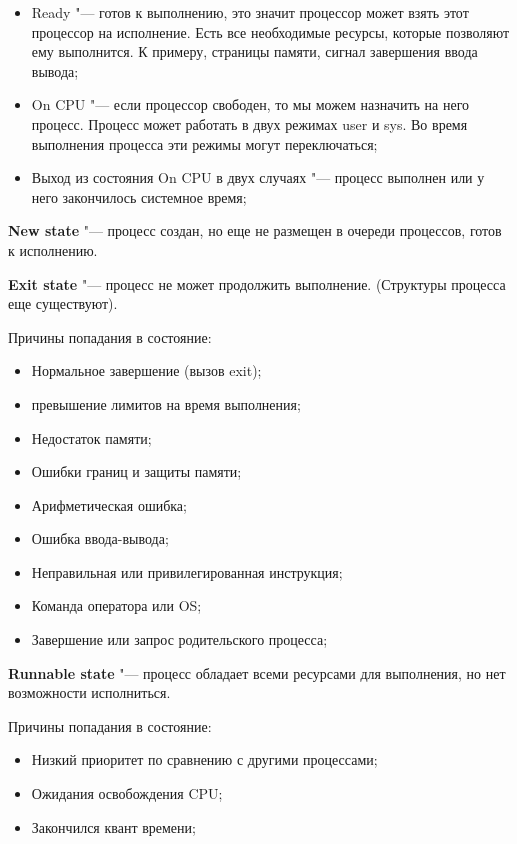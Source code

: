 \documentclass[bachelor, och, book]{SCWorks}
\theoremstyle{remark}
\begin{document}
    \begin{itemize}[label=$\bullet$]
        \item Ready "--- готов к выполнению, это значит процессор может взять этот процессор на исполнение. Есть все необходимые ресурсы, которые позволяют ему выполнится. К примеру, страницы памяти, сигнал завершения ввода вывода;
        \item On CPU "--- если процессор свободен, то мы можем назначить на него процесс. Процесс может работать в двух режимах user и sys. Во время выполнения процесса эти режимы могут переключаться;
        \item Выход из состояния On CPU в двух случаях "--- процесс выполнен или у него закончилось системное время;
    \end{itemize}

    \hfill \break
    \textbf{New state} "--- процесс создан, но еще не размещен в очереди процессов, готов к исполнению. 

    \hfill \break
    \textbf{Exit state} "--- процесс не может продолжить выполнение. (Структуры процесса еще существуют).

    Причины попадания в состояние:
    
    \begin{itemize}[label=$\bullet$]
        \item Нормальное завершение (вызов exit);
        \item превышение лимитов на время выполнения;
        \item Недостаток памяти;
        \item Ошибки границ и защиты памяти;
        \item Арифметическая ошибка;
        \item Ошибка ввода-вывода;
        \item Неправильная или привилегированная инструкция;
        \item Команда оператора или OS;
        \item Завершение или запрос родительского процесса;
    \end{itemize}

    \hfill \break
    \textbf{Runnable state} "--- процесс обладает всеми ресурсами для выполнения, но нет возможности исполниться.

    Причины попадания в состояние:

    \begin{itemize}[label=$\bullet$]
        \item Низкий приоритет по сравнению с другими процессами;
        \item Ожидания освобождения CPU;
        \item Закончился квант времени;
    \end{itemize}
\end{document}
